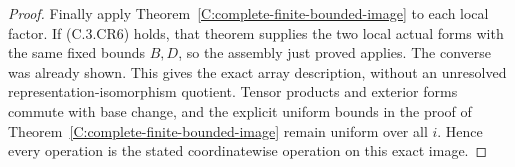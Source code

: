 \begin{proof}
Finally apply
Theorem~\ref{C:complete-finite-bounded-image}
to each local factor. If (C.3.CR6) holds, that
theorem supplies the two local actual forms
with the same fixed bounds $B,D$, so the assembly
just proved applies. The converse was already
shown. This gives the exact array description,
without an unresolved representation-isomorphism
quotient.
Tensor products and exterior forms commute with
base change, and the explicit uniform bounds
in the proof of
Theorem~\ref{C:complete-finite-bounded-image}
remain uniform over all $i$.
Hence every operation is the stated coordinatewise
operation on this exact image.
\end{proof}
